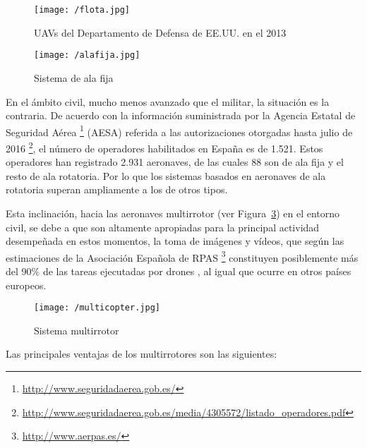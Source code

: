 \begin{figure}[!h]
\begin{center}
\texttt{[image: /flota.jpg]}
\caption[\acs{UAV}s del Departamento de Defensa de EE.UU. en el 2013]{\acs{UAV}s del Departamento de Defensa de EE.UU. en el 2013 \cite{ambitocivil2}}
\label{fig:flota}
\end{center}
\end{figure}

\begin{figure}[!h]
\begin{center}
\texttt{[image: /alafija.jpg]}
\caption[Sistema de ala fija]{Sistema de ala fija}
\label{fig:alafija}
\end{center}
\end{figure}

En el ámbito civil, mucho menos avanzado que el militar, la situación es la contraria. De acuerdo con la información suministrada por la Agencia Estatal de Seguridad Aérea \footnote{\url{http://www.seguridadaerea.gob.es/}} (AESA) referida a las autorizaciones otorgadas hasta julio de 2016 \footnote{\url{http://www.seguridadaerea.gob.es/media/4305572/listado_operadores.pdf}}, el número de operadores habilitados en España es de 1.521. Estos operadores han registrado 2.931 aeronaves, de las cuales 88 son de ala fija y el resto de ala rotatoria. Por lo que los sistemas basados en aeronaves de ala rotatoria superan ampliamente a los de otros tipos.

\clearpage

Esta inclinación, hacia las aeronaves multirrotor (ver Figura~\ref{fig:multirrotor}) en el entorno civil, se debe a que son altamente apropiadas para la principal actividad desempeñada en estos momentos, la toma de imágenes y vídeos, que según las estimaciones de la Asociación Española de RPAS \footnote{\url{http://www.aerpas.es/}} constituyen posiblemente más del 90\% de las tareas ejecutadas por drones \cite{AERPAS}, al igual que ocurre en otros países europeos.

\begin{figure}[!h]
\begin{center}
\texttt{[image: /multicopter.jpg]}
\caption[Sistema multirrotor]{Sistema multirrotor}
\label{fig:multirrotor}
\end{center}
\end{figure}

Las principales ventajas de los multirrotores son las siguientes:

